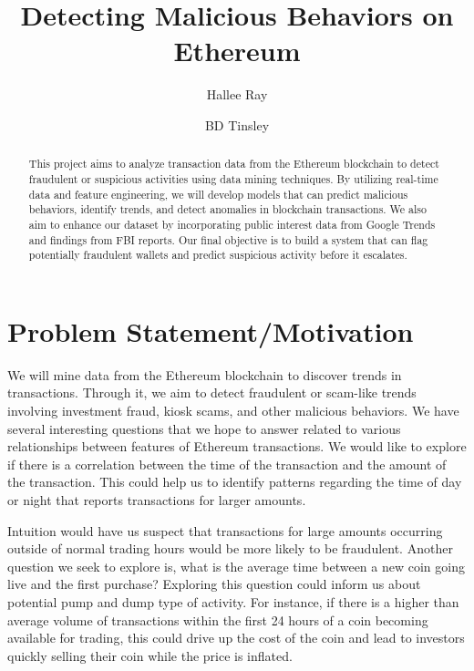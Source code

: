 \documentclass[sigconf]{acmart}
\title{Detecting Malicious Behaviors on Ethereum}
\author{Hallee Ray}
\affiliation{%
  \institution{Univeristy of Colorado - Boulder}
  \city{Boulder}
  \state{Colorado}
  \country{USA}
  \postcode{ZIP code}
}
\author{BD Tinsley}
\affiliation{%
  \institution{Univeristy of Colorado - Boulder}
  \city{Boulder}
  \state{Colorado}
  \country{USA}
  \postcode{ZIP code}
}
\begin{document}
\begin{abstract}
This project aims to analyze transaction data from the Ethereum blockchain to detect fraudulent or suspicious activities using data mining techniques. By utilizing real-time data and feature engineering, we will develop models that can predict malicious behaviors, identify trends, and detect anomalies in blockchain transactions. We also aim to enhance our dataset by incorporating public interest data from Google Trends and findings from FBI reports. Our final objective is to build a system that can flag potentially fraudulent wallets and predict suspicious activity before it escalates.
\end{abstract}


\maketitle

\section{Problem Statement/Motivation}

We will mine data from the Ethereum blockchain to discover trends in transactions. Through it, we aim to detect fraudulent or scam-like trends involving investment fraud, kiosk scams, and other malicious behaviors. We have several interesting questions that we hope to answer related to various relationships between features of Ethereum transactions. We would like to explore if there is a correlation between the time of the transaction and the amount of the transaction. This could help us to identify patterns regarding the time of day or night that reports transactions for larger amounts.

Intuition would have us suspect that transactions for large amounts occurring outside of normal trading hours would be more likely to be fraudulent. Another question we seek to explore is, what is the average time between a new coin going live and the first purchase? Exploring this question could inform us about potential pump and dump type of activity. For instance, if there is a higher than average volume of transactions within the first 24 hours of a coin becoming available for trading, this could drive up the cost of the coin and lead to investors quickly selling their coin while the price is inflated.
\end{document}
